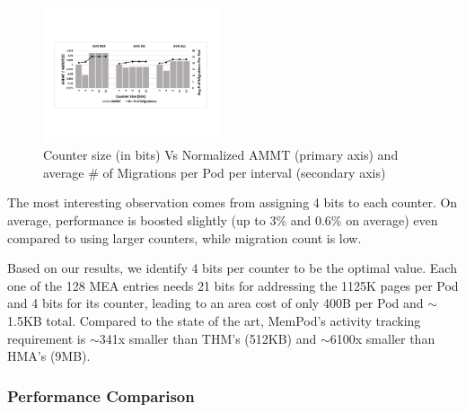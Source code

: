 \begin{figure}[h]
  \includegraphics[width=0.46\textwidth]{figures/counter_size_normalized.pdf}
  \caption{Counter size (in bits) Vs Normalized AMMT (primary axis) and average \# of Migrations per Pod per interval (secondary axis)}
  \label{fig:counter_size}
\end{figure}

The most interesting observation comes from assigning 4 bits to each counter. On average, performance is boosted slightly (up to 3\% and 0.6\% on average) even compared to using larger counters, while migration count is low. %

Based on our results, we identify 4 bits per counter to be the optimal value. Each one of the 128 MEA entries needs 21 bits for addressing the 1125K pages per Pod and 4 bits for its counter, leading to an area cost of only 400B per Pod and $\sim$1.5KB total. Compared to the state of the art, MemPod's activity tracking requirement is $\sim$341x smaller than THM's (512KB) and $\sim$6100x smaller than HMA's (9MB).

\subsubsection{Performance Comparison}
\label{sub:performance}

